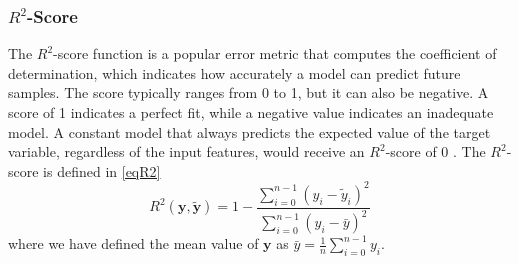 \subsubsection{$R^2$-Score}
\noindent The $R^2$-score function is a popular error metric that computes the coefficient of determination, which indicates how
accurately a model can predict future samples. The score typically ranges from 0 to 1, but it can also be negative. A score of 1 indicates
a perfect fit, while a negative value indicates an inadequate model. A constant model that always predicts the expected value of the target
variable, regardless of the input features, would receive an $R^2$-score of 0 \cite{Week34}. The $R^2$-score is defined in \eqref{eqR2}
%
\begin{equation}\label{eqR2} 
R^2(\boldsymbol{y}, \tilde{\boldsymbol{y}}) = 1 - \frac{\sum_{i=0}^{n - 1} (y_i - \tilde{y}_i)^2}{\sum_{i=0}^{n - 1} (y_i - \bar{y})^2}
\end{equation}
%
\noindent where we have defined the mean value of $\boldsymbol{y}$ as $\bar{y} =  \frac{1}{n} \sum_{i=0}^{n - 1} y_i$.

